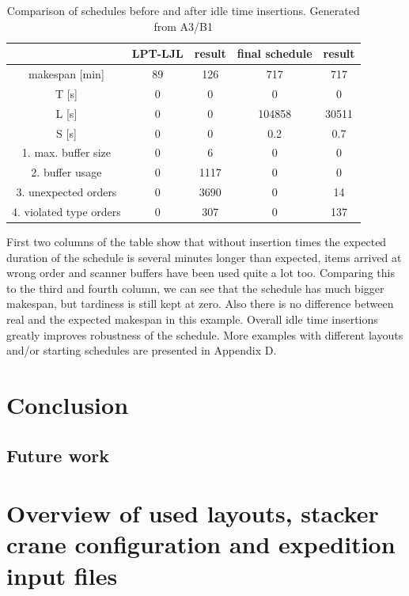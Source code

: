 \documentclass{ctuthesis}
\begin{document}
\begin{table}[H]
\begin{tabular}{ |c|| c | c | c | c |} 
\hline
 & LPT-LJL & result & final schedule & result \\ 
\hline
makespan [min] & 89 & 126 & 717 & 717 \\
\hline
T [s]& 0 & 0 & 0 & 0 \\
\hline
L [s]& 0 & 0 & 104858 & 30511 \\
\hline
S [s]& 0 & 0 & 0.2 & 0.7 \\
\hline
1. max. buffer size & 0 & 6 & 0 & 0\\ 
\hline
2. buffer usage  & 0 & 1117 & 0 & 0\\ 
\hline
3. unexpected orders & 0 & 3690 & 0 & 14\\ 
\hline
4. violated type orders & 0 & 307 & 0 & 137\\ 
\hline
\end{tabular}
\caption{Comparison of schedules before and after idle time insertions. Generated from A3/B1} \label{tab:idle1}
\end{table}

First two columns of the table show that without insertion times the expected duration of the schedule is several minutes longer than expected, items arrived at wrong order and scanner buffers have been used quite a lot too. Comparing this to the third and fourth column, we can see that the schedule has much bigger makespan, but tardiness is still kept at zero. Also there is no difference between real and the expected makespan in this example. Overall idle time insertions greatly improves robustness of the schedule. More examples with different layouts and/or starting schedules are presented in Appendix D.

\chapter{Conclusion}

\section{Future work}




\appendix

\chapter{Overview of used layouts, stacker crane configuration and expedition input files}
\end{document}
